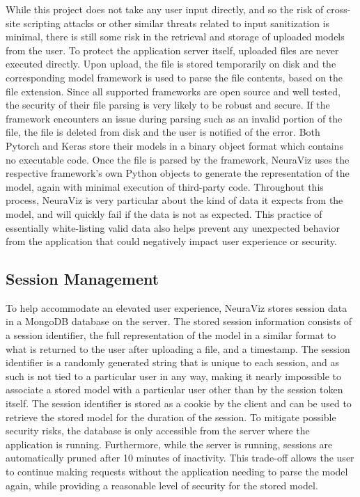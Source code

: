 While this project does not take any user input directly, and so the risk of cross-site scripting attacks or other similar threats related to input sanitization is minimal, there is still some risk in the retrieval and storage of uploaded models from the user. To protect the application server itself, uploaded files are never executed directly. Upon upload, the file is stored temporarily on disk and the corresponding model framework is used to parse the file contents, based on the file extension. Since all supported frameworks are open source and well tested, the security of their file parsing is very likely to be robust and secure. If the framework encounters an issue during parsing such as an invalid portion of the file, the file is deleted from disk and the user is notified of the error. Both Pytorch and Keras store their models in a binary object format which contains no executable code. Once the file is parsed by the framework, NeuraViz uses the respective framework's own Python objects to generate the representation of the model, again with minimal execution of third-party code. Throughout this process, NeuraViz is very particular about the kind of data it expects from the model, and will quickly fail if the data is not as expected. This practice of essentially white-listing valid data also helps prevent any unexpected behavior from the application that could negatively impact user experience or security.

\subsection{Session Management}
To help accommodate an elevated user experience, NeuraViz stores session data in a MongoDB database on the server. The stored session information consists of a session identifier, the full representation of the model in a similar format to what is returned to the user after uploading a file, and a timestamp. The session identifier is a randomly generated string that is unique to each session, and as such is not tied to a particular user in any way, making it nearly impossible to associate a stored model with a particular user other than by the session token itself. The session identifier is stored as a cookie by the client and can be used to retrieve the stored model for the duration of the session. To mitigate possible security risks, the database is only accessible from the server where the application is running. Furthermore, while the server is running, sessions are automatically pruned after 10 minutes of inactivity. This trade-off allows the user to continue making requests without the application needing to parse the model again, while providing a reasonable level of security for the stored model.
